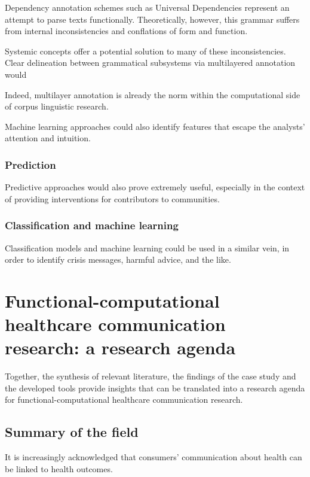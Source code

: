 Dependency annotation schemes such as Universal Dependencies represent an attempt to parse texts functionally. Theoretically, however, this grammar suffers from internal inconsistencies and conflations of form and function.

Systemic concepts offer a potential solution to many of these inconsistencies. Clear delineation between grammatical subsystems via multilayered annotation would 

Indeed, multilayer annotation is already the norm within the computational side of corpus linguistic research.


Machine learning approaches could also identify features that escape the analysts' attention and intuition.

\subsubsection{Prediction} \lipsum

Predictive approaches would also prove extremely useful, especially in the context of providing interventions for contributors to communities.

\subsubsection{Classification and machine learning} \lipsum

Classification models and machine learning could be used in a similar vein, in order to identify crisis messages, harmful advice, and the like.



\section{Functional-computational healthcare communication research: a research agenda} \lipsum

Together, the synthesis of relevant literature, the findings of the case study and the developed tools provide insights that can be translated into a research agenda for functional-computational healthcare communication research.

\subsection{Summary of the field}

It is increasingly acknowledged that consumers' communication about health can be linked to health outcomes.

